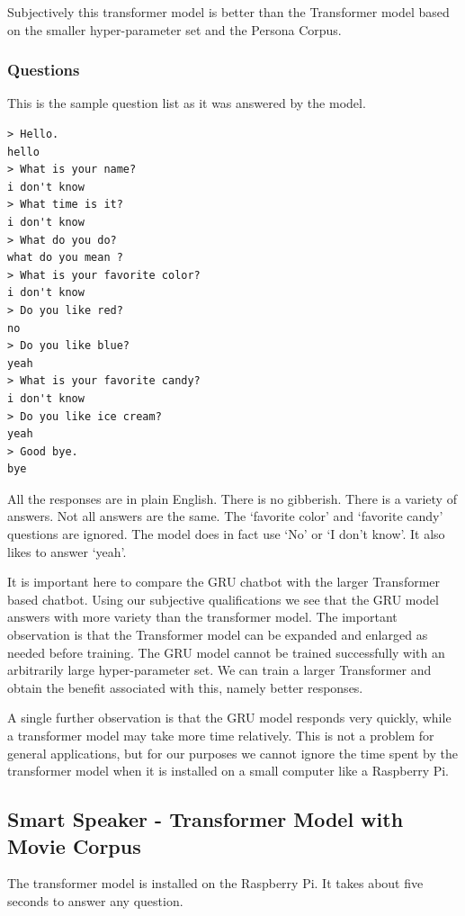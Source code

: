 Subjectively this transformer model is better than the Transformer model based on the smaller hyper-parameter set and the Persona Corpus.


\subsubsection*{Questions}
This is the sample question list as it was answered by the model.

\begin{verbatim}
> Hello.
hello 
> What is your name?
i don't know 
> What time is it?
i don't know 
> What do you do?
what do you mean ?
> What is your favorite color?
i don't know 
> Do you like red?
no 
> Do you like blue?
yeah 
> What is your favorite candy?
i don't know 
> Do you like ice cream?
yeah 
> Good bye.
bye 
\end{verbatim}

All the responses are in plain English. There is no gibberish. There is a variety of answers. Not all answers are the same.  The `favorite color' and `favorite candy' questions are ignored.  The model does in fact use `No' or `I don't know'. It also likes to answer `yeah'.

It is important here to compare the GRU chatbot with the larger Transformer based chatbot. Using our subjective qualifications we see that the GRU model answers with more variety than the transformer model. The important observation is that the Transformer model can be expanded and enlarged as needed before training. The GRU model cannot be trained successfully with an arbitrarily large hyper-parameter set. We can train a larger Transformer and obtain the benefit associated with this, namely better responses.

A single further observation is that the GRU model responds very quickly, while a transformer model may take more time relatively. This is not a problem for general applications, but for our purposes we cannot ignore the time spent by the transformer model when it is installed on a small computer like a Raspberry Pi. 

\subsection{Smart Speaker - Transformer Model with Movie Corpus}

The transformer model is installed on the Raspberry Pi. It takes about five seconds to answer any question.

